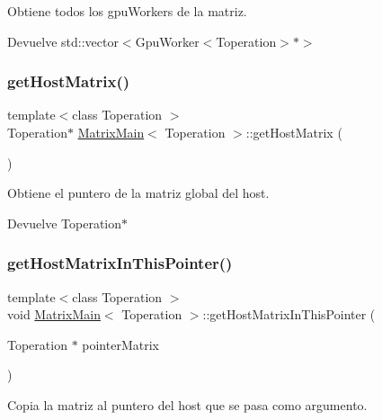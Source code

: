Obtiene todos los gpu\+Workers de la matriz. 

\begin{DoxyReturn}{Devuelve}
std\+::vector$<$Gpu\+Worker$<$\+Toperation$>$$\ast$$>$ 
\end{DoxyReturn}
\mbox{\label{classMatrixMain_a34fdb08ac465293c535168c626ab181d}} 
\subsubsection{\texorpdfstring{get\+Host\+Matrix()}{getHostMatrix()}}
{\footnotesize\ttfamily template$<$class Toperation $>$ \\
Toperation$\ast$ \hyperlink{classMatrixMain}{Matrix\+Main}$<$ Toperation $>$\+::get\+Host\+Matrix (\begin{DoxyParamCaption}{ }\end{DoxyParamCaption})}



Obtiene el puntero de la matriz global del host. 

\begin{DoxyReturn}{Devuelve}
Toperation$\ast$ 
\end{DoxyReturn}
\mbox{\label{classMatrixMain_ad53a94f43e0c1544a497cb238aaaa364}} 
\subsubsection{\texorpdfstring{get\+Host\+Matrix\+In\+This\+Pointer()}{getHostMatrixInThisPointer()}}
{\footnotesize\ttfamily template$<$class Toperation $>$ \\
void \hyperlink{classMatrixMain}{Matrix\+Main}$<$ Toperation $>$\+::get\+Host\+Matrix\+In\+This\+Pointer (\begin{DoxyParamCaption}\item[{Toperation $\ast$}]{pointer\+Matrix }\end{DoxyParamCaption})}



Copia la matriz al puntero del host que se pasa como argumento. 


